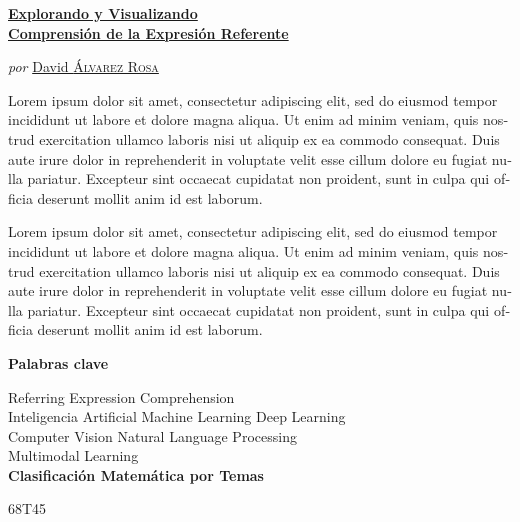\begin{otherlanguage}{spanish}
  \begin{center}
    \Large
    \href{https://recomprehension.com/}{\textbf{Explorando y Visualizando\\
        Comprensión de la Expresión Referente}}

    \vspace{2ex} \large \textit{por}
    \href{https://david.alvarezrosa.com/}{David \textsc{Álvarez Rosa}}

    \vspace{3ex} \textbf{\abstractname}
  \end{center}

  \vspace{-2ex}
  \noindent Lorem ipsum dolor sit amet, consectetur adipiscing elit, sed do
  eiusmod tempor incididunt ut labore et dolore magna aliqua. Ut enim ad minim
  veniam, quis nostrud exercitation ullamco laboris nisi ut aliquip ex ea
  commodo consequat. Duis aute irure dolor in reprehenderit in voluptate velit
  esse cillum dolore eu fugiat nulla pariatur. Excepteur sint occaecat
  cupidatat non proident, sunt in culpa qui officia deserunt mollit anim id est
  laborum.

  Lorem ipsum dolor sit amet, consectetur adipiscing elit, sed do eiusmod
  tempor incididunt ut labore et dolore magna aliqua. Ut enim ad minim veniam,
  quis nostrud exercitation ullamco laboris nisi ut aliquip ex ea commodo
  consequat. Duis aute irure dolor in reprehenderit in voluptate velit esse
  cillum dolore eu fugiat nulla pariatur. Excepteur sint occaecat cupidatat non
  proident, sunt in culpa qui officia deserunt mollit anim id est laborum.

  \begin{center}


    \bigskip\smallskip \textbf{Palabras clave}

    Referring Expression Comprehension\\
    Inteligencia Artificial \textbullet{} Machine Learning \textbullet{} Deep
    Learning\\
    Computer Vision \textbullet{} Natural Language Processing\\
    Multimodal Learning\\

    \bigskip \textbf{Clasificación Matemática por Temas}

    68T45
  \end{center}
\end{otherlanguage}
\vfill\null


